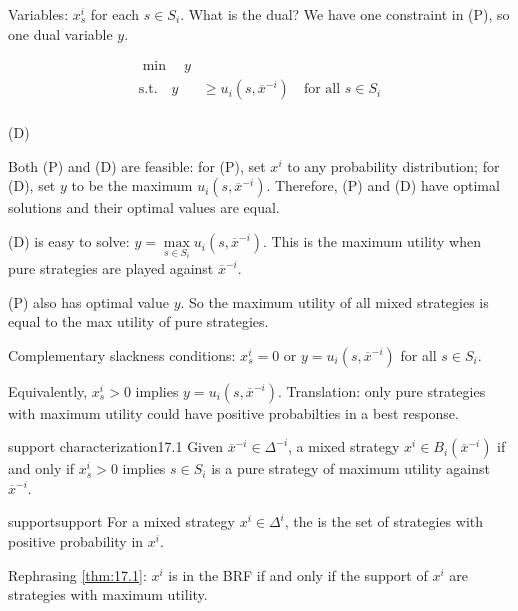\documentclass[12pt,letterpaper]{report}
\begin{document}
Variables: $x_s^i$ for each $s \in S_i$.
What is the dual?
We have one constraint in (P), so one dual variable $y$.

\begin{minipage}{0.9\textwidth}
  \begin{align*}
    \min \quad y & \\
    \text{s.t.} \quad y &\geq u_i(s, \overline{x}^{-i}) \quad \text{for all } s \in S_i \\
  \end{align*}
\end{minipage}\hfill\begin{minipage}{0.05\textwidth}
  (D)
\end{minipage}

Both (P) and (D) are feasible: for (P), set $x^i$ to any probability distribution; for (D), set $y$
to be the maximum $u_i(s, \overline{x}^{-i})$.
Therefore, (P) and (D) have optimal solutions and their optimal values are equal.

(D) is easy to solve: $y = \max\limits_{s \in S_i} u_i(s, \overline{x}^{-i})$.
This is the maximum utility when pure strategies are played against $\overline{x}^{-i}$.

(P) also has optimal value $y$.
So the maximum utility of all mixed strategies is equal to the max utility of pure strategies.

Complementary slackness conditions: $x_s^i = 0$ or $y = u_i(s, \overline{x}^{-i})$ for all
$s \in S_i$.

Equivalently, $x_s^i > 0$ implies $y = u_i(s, \overline{x}^{-i})$.
Translation: only pure strategies with maximum utility could have positive probabilties in a best
response.

\begin{thm}{support characterization}{17.1}
  Given $\overline{x}^{-i} \in \Delta^{-i}$, a mixed strategy $x^i \in B_i(\overline{x}^{-i})$ if
  and only if $x_s^i > 0$ implies $s \in S_i$ is a pure strategy of maximum utility against
  $\overline{x}^{-i}$.
\end{thm}

\begin{defn}{support}{support}
  For a mixed strategy $x^i \in \Delta^i$, the  is the set of strategies with
  positive probability in $x^i$.
\end{defn}

Rephrasing \cref{thm:17.1}: $x^i$ is in the BRF if and only if the support of $x^i$ are strategies
with maximum utility.
\end{document}
